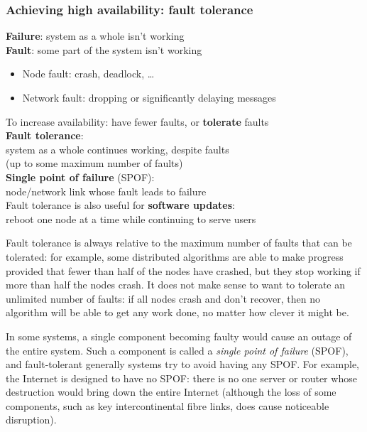 \begin{frame}
    \label{s:fault-tolerance}
    \frametitle{Achieving high availability: fault tolerance}
    \textbf{Failure}: system as a whole isn't working\\
    \textbf{Fault}: some part of the system isn't working
    \begin{itemize}
        \item Node fault: crash, deadlock, \dots
        \item Network fault: dropping or significantly delaying messages\pause\\[1em]
    \end{itemize}
    To increase availability: have fewer faults, or \textbf{tolerate} faults\\[1em]
    \textbf{Fault tolerance}:\\system as a whole continues working, despite faults\\
    (up to some maximum number of faults)\pause\\[1em]
    \textbf{Single point of failure} (SPOF):\\ node/network link whose fault leads to failure\\[1em]
    Fault tolerance is also useful for \textbf{software updates}:\\ reboot one node at a time while continuing to serve users
\end{frame}
\label{l:fault-tolerance}

Fault tolerance is always relative to the maximum number of faults that can be tolerated: for example, some distributed algorithms are able to make progress provided that fewer than half of the nodes have crashed, but they stop working if more than half the nodes crash.
It does not make sense to want to tolerate an unlimited number of faults: if all nodes crash and don't recover, then no algorithm will be able to get any work done, no matter how clever it might be.

In some systems, a single component becoming faulty would cause an outage of the entire system.
Such a component is called a \emph{single point of failure} (SPOF), and fault-tolerant generally systems try to avoid having any SPOF.
For example, the Internet is designed to have no SPOF: there is no one server or router whose destruction would bring down the entire Internet (although the loss of some components, such as key intercontinental fibre links, does cause noticeable disruption).

